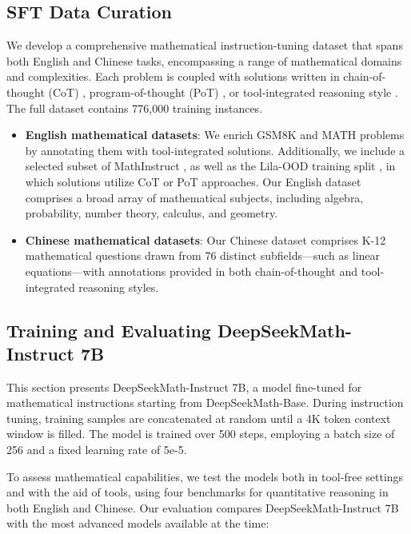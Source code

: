 \begin{itemize}[topsep=0pt]
\subsection{SFT Data Curation}

We develop a comprehensive mathematical instruction-tuning dataset that spans both English and Chinese tasks, encompassing a range of mathematical domains and complexities. Each problem is coupled with solutions written in chain-of-thought (CoT) \citep{cot}, program-of-thought (PoT) \citep{pot,pal}, or tool-integrated reasoning style \citep{tora}. The full dataset contains 776,000 training instances.

\begin{itemize}[topsep=0pt]
    \item \textbf{English mathematical datasets}: We enrich GSM8K and MATH problems by annotating them with tool-integrated solutions. Additionally, we include a selected subset of MathInstruct \citep{MathInstruct}, as well as the Lila-OOD training split \citep{lila}, in which solutions utilize CoT or PoT approaches. Our English dataset comprises a broad array of mathematical subjects, including algebra, probability, number theory, calculus, and geometry.
    \item \textbf{Chinese mathematical datasets}: Our Chinese dataset comprises K-12 mathematical questions drawn from 76 distinct subfields—such as linear equations—with annotations provided in both chain-of-thought and tool-integrated reasoning styles.
\end{itemize}

\subsection{Training and Evaluating DeepSeekMath-Instruct 7B}

This section presents DeepSeekMath-Instruct 7B, a model fine-tuned for mathematical instructions starting from DeepSeekMath-Base. During instruction tuning, training samples are concatenated at random until a 4K token context window is filled. The model is trained over 500 steps, employing a batch size of 256 and a fixed learning rate of 5e-5.

To assess mathematical capabilities, we test the models both in tool-free settings and with the aid of tools, using four benchmarks for quantitative reasoning in both English and Chinese. Our evaluation compares DeepSeekMath-Instruct 7B with the most advanced models available at the time:


\end{itemize}
